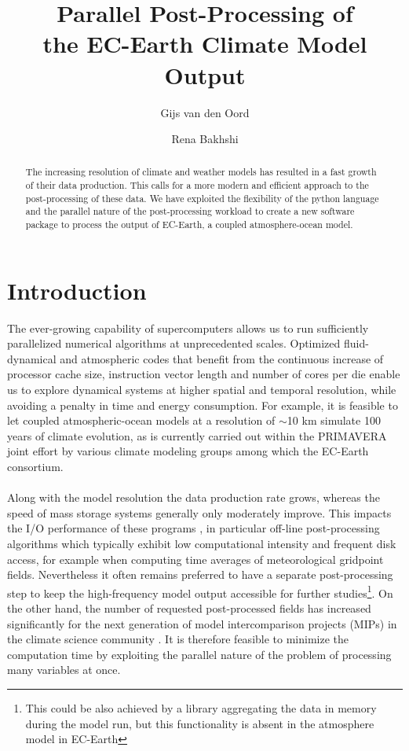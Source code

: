 \documentclass[procedia]{easychair}
\title{Parallel Post-Processing of\\ the EC-Earth Climate Model Output}
\author{
    Gijs van den Oord%
\and
    Rena Bakhshi%
}
\institute{
  Netherlands eScience Center,
  Amsterdam, The Netherlands\\
  \email{\{g.vandenoord,r.bakhshi\}@esciencecenter.nl}
\\
 }
\begin{document}
\maketitle

\begin{abstract}
The increasing resolution of climate and weather models has resulted in a fast 
growth of their data production. This calls for a more modern and efficient 
approach to the post-processing of these data. We have exploited the 
flexibility of the python language and the parallel nature of the 
post-processing workload to create a new software package to process the output 
of EC-Earth, a coupled atmosphere-ocean 
model. 
\end{abstract}

\section{Introduction}
The ever-growing capability of supercomputers allows us to run sufficiently 
parallelized numerical algorithms at unprecedented scales. Optimized 
fluid-dynamical and atmospheric codes that benefit from the continuous 
increase of processor cache size, instruction vector length and number of 
cores per die enable us to explore dynamical systems at higher 
spatial and temporal resolution, while avoiding a penalty in time and energy 
consumption. For example, it is feasible to let coupled atmospheric-ocean 
models at a resolution of $\sim$10 km simulate 100 years of climate 
evolution, as is currently carried out within the PRIMAVERA joint effort 
\cite{PRIMAVERA} by 
various climate modeling groups among which the EC-Earth \cite{ECEARTHv22} 
consortium.\\
\\
Along with the model resolution the data production rate grows, 
whereas the speed of mass storage systems generally only moderately improve. 
This impacts the I/O performance of these programs \cite{Asif20142370}, in 
particular off-line 
post-processing algorithms which typically exhibit low computational intensity 
and frequent disk access, for example when computing time averages of 
meteorological gridpoint fields. Nevertheless it often remains preferred to 
have a separate post-processing step to keep the high-frequency model output 
accessible for further studies\footnote{This could be also achieved by a 
library aggregating the data in memory during the model run, but 
this functionality is absent in the atmosphere model in EC-Earth}. On the other 
hand, the number of requested post-processed fields has increased significantly 
for the next generation of model intercomparison projects (MIPs) in the climate 
science community \cite{CMIP6}. It is therefore feasible to minimize the 
computation time by 
exploiting the parallel nature of the problem of processing many variables at 
once.\\
\end{document}

